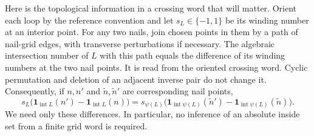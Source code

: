 Here is the topological information in a crossing word that will
matter.  Orient each loop by the reference convention and let
$s_L\in\{-1,1\}$ be its winding number at an interior point.
For any two nails, join chosen points in them by a path of nail-grid
edges, with transverse perturbations if necessary.  The algebraic
intersection number of $L$ with this path equals the difference of
its winding numbers at the two nail points.  It is read from the
oriented crossing word.  Cyclic permutation and deletion of an
adjacent inverse pair do not change it.  Consequently, if $n,n'$
and $\widetilde n,\widetilde n'$ are corresponding nail points,
\begin{equation}
 s_L\bigl(\mathbf1_{\operatorname{int}L}(n')
                  -\mathbf1_{\operatorname{int}L}(n)\bigr)
 =s_{\psi(L)}
       \bigl(\mathbf1_{\operatorname{int}\psi(L)}(\widetilde n')
                  -\mathbf1_{\operatorname{int}\psi(L)}(\widetilde n)\bigr).
 \label{eq:rr-winding-difference}
\end{equation}
We need only these differences.  In particular, no inference of an
absolute inside set from a finite grid word is required.

